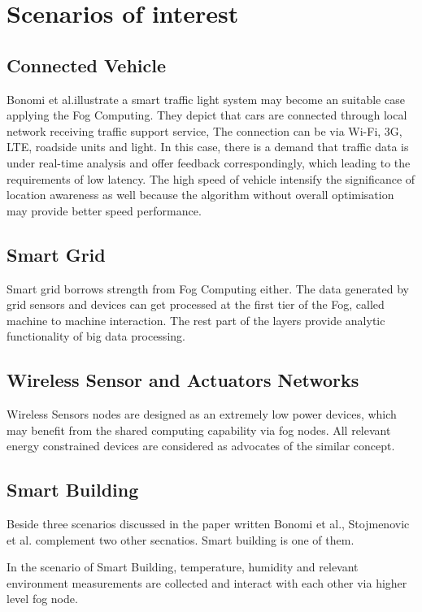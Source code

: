 \section{Scenarios of interest}

\subsection{Connected Vehicle}
Bonomi et al.\cite{bonomi2012fog}illustrate a smart traffic light system may become an suitable case applying the Fog Computing. They depict that cars are connected through local network receiving traffic support service, The connection can be via Wi-Fi, 3G, LTE, roadside units and light. In this case, there is a demand that traffic data is under real-time analysis and offer feedback correspondingly, which leading to the requirements of low latency. The high speed of vehicle intensify the significance of location awareness as well because the algorithm without overall optimisation may provide better speed performance.

\subsection{Smart Grid}
Smart grid borrows strength from Fog Computing either. The data generated by grid sensors and devices can get processed at the first tier of the Fog, called machine to machine interaction. The rest part of the layers provide analytic functionality of big data processing. 

\subsection{Wireless Sensor and Actuators Networks}
Wireless Sensors nodes are designed as an extremely low power devices, which may benefit from the shared computing capability via fog nodes. All relevant energy constrained devices are considered as advocates of the similar concept.

\subsection{Smart Building}
Beside three scenarios discussed in the paper written Bonomi et al.\cite{bonomi2012fog}, Stojmenovic et al. complement two other secnatios.\cite{stojmenovic2014fog} Smart building is one of them.

In the scenario of Smart Building, temperature, humidity and relevant environment measurements are collected and interact with each other via higher level fog node.

